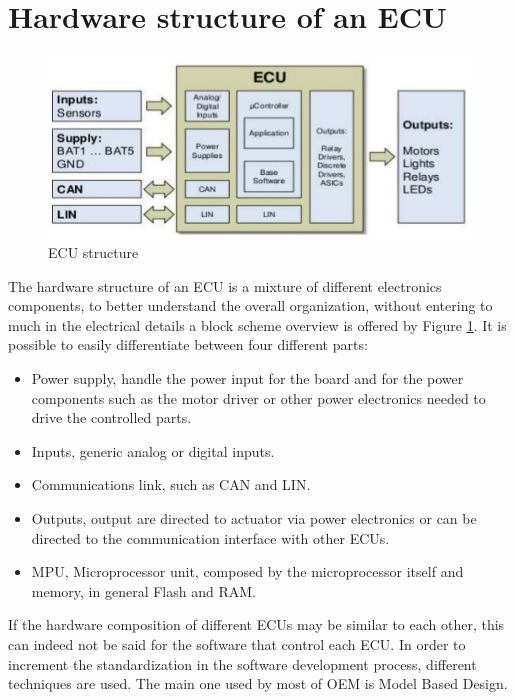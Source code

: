 \documentclass[../main.tex]{subfiles}
\begin{document}
\section{Hardware structure of an ECU}
\begin{figure}[h]
    \centering
    \includegraphics[width=\linewidth]{images_folder/electronic-control-unitecu-6-638.jpg}
    \caption{ECU structure}
    \label{fig:ECUHW}
\end{figure}
The hardware structure of an \gls{ECU} is a mixture of different electronics components, to better understand the overall organization, without entering to much in the electrical details a block scheme overview is offered by Figure  \ref{fig:ECUHW}. It is possible to easily differentiate between four different parts:
\begin{itemize}
    \item Power supply, handle the power input for the board and for the power components such as the motor driver or other power electronics needed to drive the controlled parts. 
    \item Inputs, generic analog or digital inputs.
    \item Communications link, such as \gls{CAN} and \gls{LIN}.
    \item Outputs, output are directed to actuator via power electronics or can be directed to the communication interface with other \gls{ECU}s.
    \item \gls{MPU}, Microprocessor unit, composed by the microprocessor itself and memory, in general Flash and \gls{RAM}. 
\end{itemize}
If the hardware composition of different \gls{ECU}s may be similar to each other, this can indeed not be said for the software that control each \gls{ECU}. In order to increment the standardization in the software development process, different techniques are used. The main one used by most of \gls{OEM} is Model Based Design. 
\end{document}
